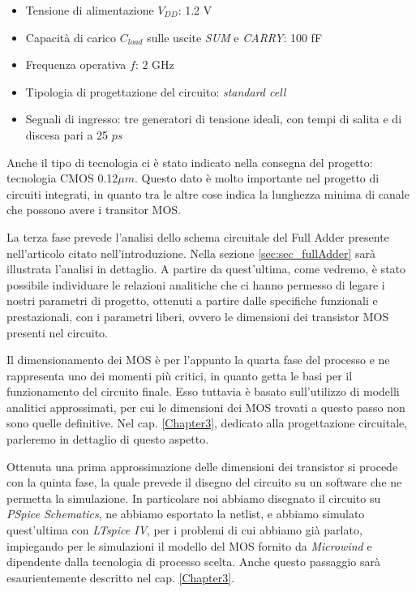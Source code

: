 \begin{itemize}
	\item Tensione di alimentazione $V _{DD}$: 1.2 V
	\item Capacità di carico $C _{load}$ sulle uscite \textit{SUM} e \textit{CARRY}: 100 fF
	\item Frequenza operativa $f$: 2 GHz
	\item Tipologia di progettazione del circuito: \textit{standard cell}
	\item Segnali di ingresso: tre generatori di tensione ideali, con tempi di salita e di discesa pari a 25 $ps$
\end{itemize}

Anche il tipo di tecnologia ci è stato indicato nella consegna del progetto: tecnologia CMOS 0.12$\mu m$. Questo dato è molto importante nel progetto di circuiti integrati, in quanto tra le altre cose indica la lunghezza minima di canale che possono avere i transitor MOS.

La terza fase prevede l'analisi dello schema circuitale del Full Adder presente nell'articolo citato nell'introduzione. Nella sezione \ref{sec:sec_fullAdder} sarà illustrata l'analisi in dettaglio. A partire da quest'ultima, come vedremo, è stato possibile individuare le relazioni analitiche che ci hanno permesso di legare i nostri parametri di progetto, ottenuti a partire dalle specifiche funzionali e prestazionali, con i parametri liberi, ovvero le dimensioni dei transistor MOS presenti nel circuito. 

Il dimensionamento dei MOS è per l'appunto la quarta fase del processo e ne rappresenta uno dei momenti più critici, in quanto getta le basi per il funzionamento del circuito finale. Esso tuttavia è basato sull'utilizzo di modelli analitici approssimati, per cui le dimensioni dei MOS trovati a questo passo non sono quelle definitive. Nel cap. \ref{Chapter3}, dedicato alla progettazione circuitale, parleremo in dettaglio di questo aspetto.

Ottenuta una prima approssimazione delle dimensioni dei transistor si procede con la quinta fase, la quale prevede il disegno del circuito su un software che ne permetta la simulazione. In particolare noi abbiamo disegnato il circuito su \textit{PSpice Schematics}, ne abbiamo esportato la netlist, e abbiamo simulato quest'ultima con \textit{LTspice IV}, per i problemi di cui abbiamo già parlato, impiegando per le simulazioni il modello del MOS fornito da \textit{Microwind} e dipendente dalla tecnologia di processo scelta. Anche questo passaggio sarà esaurientemente descritto nel cap. \ref{Chapter3}.

